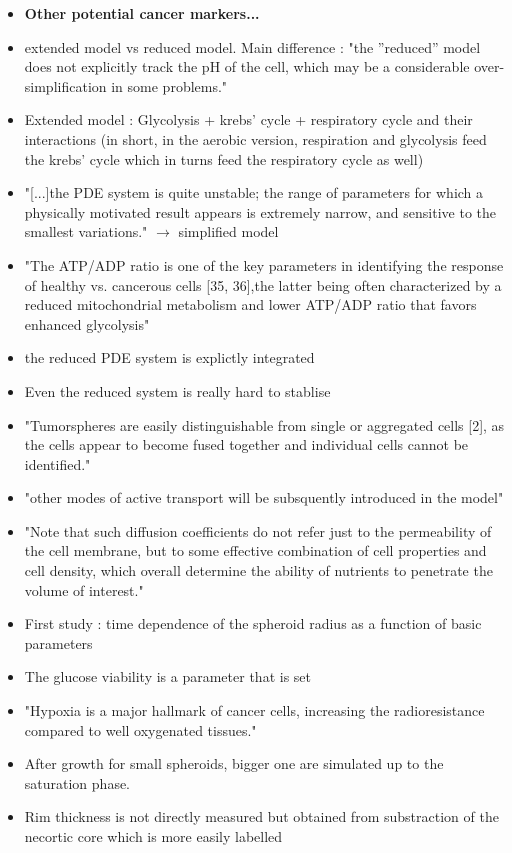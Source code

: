 \documentclass[11pt,a4paper]{article}
\begin{document}
\begin{itemize}
\item \textbf{Other potential cancer markers...}
\item extended model vs reduced model. Main difference : "the ”reduced” model does not explicitly track the pH of the cell, which may be a considerable over-simplification in some problems."
\item Extended model : Glycolysis + krebs' cycle + respiratory cycle and their interactions (in short, in the aerobic version, respiration and glycolysis feed the krebs' cycle which in turns feed the respiratory cycle as well)
\item "[...]the PDE system is quite unstable; the range of parameters for which a physically motivated result appears is extremely narrow, and sensitive to the smallest variations." $\rightarrow$ simplified model
\item "The ATP/ADP ratio is one of the key parameters in identifying the response of healthy vs. cancerous cells [35, 36],the latter being often characterized by a reduced mitochondrial metabolism and lower ATP/ADP ratio that favors enhanced glycolysis"
\item the reduced PDE system is explictly integrated
\item Even the reduced system is really hard to stablise 
\item "Tumorspheres are easily distinguishable from single or aggregated cells [2], as the cells appear to become fused together and individual cells cannot be identified."
\item  "other modes of active transport will be subsquently introduced in the model"
\item "Note that such diffusion coefficients do not refer just to the permeability of the cell membrane, but to some effective combination of cell properties and cell density, which overall determine the ability of nutrients to penetrate the volume of interest."
\item First study : time dependence of the spheroid radius as a function of basic parameters
\item The glucose viability is a parameter that is set
\item "Hypoxia is a major hallmark of cancer cells, increasing the radioresistance compared to well oxygenated tissues."
\item After growth for small spheroids, bigger one are simulated up to the saturation phase.
\item Rim thickness is not directly measured but obtained from substraction of the necortic core which is more easily labelled 

\end{itemize}
\end{document}
